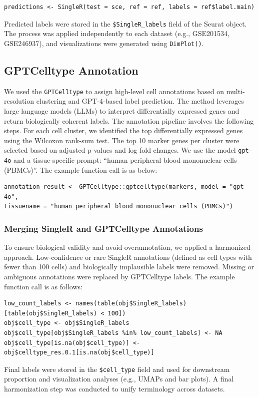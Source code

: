 \documentclass[
  12pt]{article}
\begin{document}
{\small
\begin{verbatim}
predictions <- SingleR(test = sce, ref = ref, labels = ref$label.main)
\end{verbatim}
}

Predicted labels were stored in the \texttt{\$SingleR\_labels} field of the Seurat object. The process was applied independently to each dataset (e.g., GSE201534, GSE246937), and visualizations were generated using \texttt{DimPlot()}.

\subsection*{GPTCelltype Annotation}

We used the \texttt{GPTCelltype} \cite{hou2024gptcelltype} to assign high-level cell annotations based on multi-resolution clustering and GPT-4-based label prediction. The method leverages large language models (LLMs) to interpret differentially expressed genes and return biologically coherent labels. The annotation pipeline involves the following steps. For each cell cluster, we identified the top differentially expressed genes using the Wilcoxon rank-sum test. The top 10 marker genes per cluster were selected based on adjusted p-values and log fold changes. We use the model \texttt{gpt-4o} and a tissue-specific prompt: ``human peripheral blood mononuclear cells (PBMCs)''. The example function call is as below:


{\small
\begin{verbatim}
annotation_result <- GPTCelltype::gptcelltype(markers, model = "gpt-4o", 
tissuename = "human peripheral blood mononuclear cells (PBMCs)")
\end{verbatim}
}


\subsubsection*{Merging SingleR and GPTCelltype Annotations}

To ensure biological validity and avoid overannotation, we applied a harmonized approach. Low-confidence or rare SingleR annotations (defined as cell types with fewer than 100 cells) and biologically implausible labels were removed. Missing or ambiguous annotations were replaced by GPTCelltype labels. The example function call is as follows:

{\small
\begin{verbatim}
low_count_labels <- names(table(obj$SingleR_labels)[table(obj$SingleR_labels) < 100])
obj$cell_type <- obj$SingleR_labels
obj$cell_type[obj$SingleR_labels %in% low_count_labels] <- NA
obj$cell_type[is.na(obj$cell_type)] <-obj$celltype_res.0.1[is.na(obj$cell_type)]
\end{verbatim}
}
Final labels were stored in the \texttt{\$cell\_type} field and used for downstream proportion and visualization analyses (e.g., UMAPs and bar plots). A final harmonization step was conducted to unify terminology across datasets.
\end{document}
